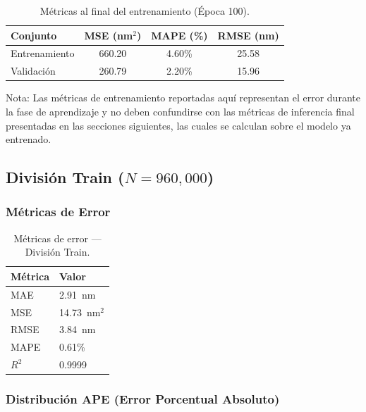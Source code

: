 \documentclass{article}
\begin{document}
\begin{table}[htbp]
\centering
\caption{Métricas al final del entrenamiento (Época 100).}
\label{tab:train-final}
\begin{tabular}{lccc}
\hline
Conjunto & MSE (nm$^2$) & MAPE (\%) & RMSE (nm) \\
\hline
Entrenamiento & 660.20 & 4.60\% & 25.58 \\
Validación    & 260.79 & 2.20\% & 15.96 \\
\hline
\end{tabular}
\end{table}

Nota: Las métricas de entrenamiento reportadas aquí representan el error durante la fase de aprendizaje y no deben confundirse con las métricas de inferencia final presentadas en las secciones siguientes, las cuales se calculan sobre el modelo ya entrenado.

\subsection{División Train ($N = 960{,}000$)}

\subsubsection{Métricas de Error}

\begin{table}[htbp]
\centering
\caption{Métricas de error — División Train.}
\label{tab:train-metrics}
\begin{tabular}{ll}
\hline
Métrica & Valor \\
\hline
MAE  & 2.91~nm \\
MSE  & 14.73~nm$^2$ \\
RMSE & 3.84~nm \\
MAPE & 0.61\% \\
$R^2$ & 0.9999 \\
\hline
\end{tabular}
\end{table}

\subsubsection{Distribución APE (Error Porcentual Absoluto)}
\end{document}
